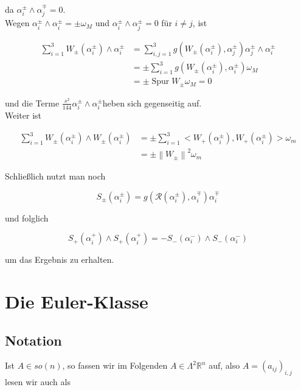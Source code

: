 \documentclass[10pt, letterpaper]{article}
\begin{document}
da $\alpha_{i}^{ \pm} \wedge \alpha_{j}^{\mp}=0$.\\
Wegen $\alpha_{i}^{ \pm} \wedge \alpha_{i}^{ \pm}= \pm \omega_{M}$ und $\alpha_{i}^{ \pm} \wedge \alpha_{j}^{ \pm}=0$ für $i \neq j$, ist

$$
\begin{aligned}
\sum_{i=1}^{3} W_{ \pm}\left(\alpha_{i}^{ \pm}\right) \wedge \alpha_{i}^{ \pm} & =\sum_{i, j=1}^{3} g\left(W_{ \pm}\left(\alpha_{i}^{ \pm}\right), \alpha_{j}^{ \pm}\right) \alpha_{j}^{ \pm} \wedge \alpha_{i}^{ \pm} \\
& = \pm \sum_{i=1}^{3} g\left(W_{ \pm}\left(\alpha_{i}^{ \pm}\right), \alpha_{i}^{ \pm}\right) \omega_{M} \\
& = \pm \operatorname{Spur} W_{ \pm} \omega_{M}=0
\end{aligned}
$$

und die Terme $\frac{s^{2}}{144} \alpha_{i}^{ \pm} \wedge \alpha_{i}^{ \pm}$heben sich gegenseitig auf.\\
Weiter ist

$$
\begin{aligned}
\sum_{i=1}^{3} W_{ \pm}\left(\alpha_{i}^{ \pm}\right) \wedge W_{ \pm}\left(\alpha_{i}^{ \pm}\right) & = \pm \sum_{i=1}^{3}<W_{+}\left(\alpha_{i}^{ \pm}\right), W_{+}\left(\alpha_{i}^{ \pm}\right)>\omega_{m} \\
& = \pm\left\|W_{ \pm}\right\|^{2} \omega_{m}
\end{aligned}
$$

Schließlich nutzt man noch

$$
S_{ \pm}\left(\alpha_{i}^{ \pm}\right)=g\left(\mathcal{R}\left(\alpha_{i}^{ \pm}\right), \alpha_{i}^{\mp}\right) \alpha_{i}^{\mp}
$$

und folglich

$$
S_{+}\left(\alpha_{i}^{+}\right) \wedge S_{+}\left(\alpha_{i}^{+}\right)=-S_{-}\left(\alpha_{i}^{-}\right) \wedge S_{-}\left(\alpha_{i}^{-}\right)
$$

um das Ergebnis zu erhalten.

\section*{Die Euler-Klasse}
\subsection*{Notation}
Ist $A \in s o(n)$, so fassen wir im Folgenden $A \in \Lambda^{2} \mathbb{R}^{n}$ auf, also $A=\left(a_{i j}\right)_{i, j}$ lesen wir auch als
\end{document}
